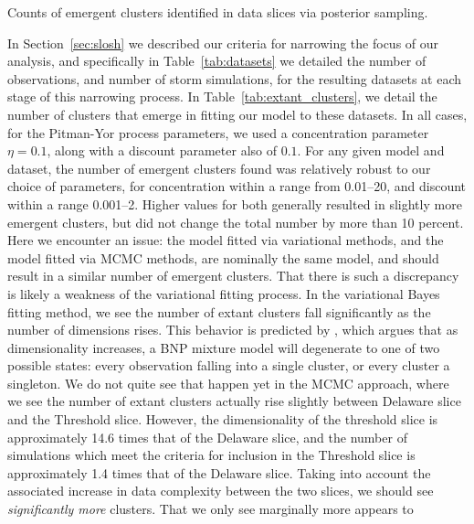 \begin{table}[tb]
    \centering 
    
    \caption{Counts of emergent clusters identified in data slices via posterior sampling.
        \label{tab:extant_clusters}}
\end{table}

In Section~\ref{sec:slosh} we described our criteria for narrowing the focus of our analysis,
    and specifically in Table~\ref{tab:datasets} we detailed the number of observations, and
    number of storm simulations, for the resulting datasets at each stage of this narrowing
    process.  In Table~\ref{tab:extant_clusters}, we detail the number of clusters that emerge
    in fitting our model to these datasets.  In all cases, for the Pitman-Yor process parameters,
    we used a concentration parameter $\eta = 0.1$, along with a discount parameter also of $0.1$.
    For any given model and dataset, the number of emergent clusters found was relatively robust 
    to our choice of parameters, for concentration within a range from \num{0.01}--\num{20}, and
    discount within a range \num{0.001}--\num{2}.  Higher values for both generally resulted in
    slightly more emergent clusters, but did not change the total number by more than \num{10} percent.
    Here we encounter an issue:  the model fitted via variational methods, and the model fitted 
    via MCMC methods, are nominally the same model, and should result in a similar number of 
    emergent clusters. That there is such a discrepancy is likely a weakness of the variational
    fitting process.  In the variational Bayes fitting method, we see the number of extant
    clusters fall significantly as the number of dimensions rises.  This behavior is predicted 
    by \cite{chandra2023}, which argues that as dimensionality increases, a BNP mixture model 
    will degenerate to one of two possible states: every observation falling into a single 
    cluster, or every cluster a singleton. We do not quite see that happen yet in the MCMC approach,
    where we see the number of extant clusters actually rise slightly between Delaware slice 
    and the Threshold slice.  However, the dimensionality of the threshold slice is approximately
    14.6 times that of the Delaware slice, and the number of simulations which meet the criteria
    for inclusion in the Threshold slice is approximately 1.4 times that of the Delaware slice.
    Taking into account the associated increase in data complexity between the two slices, we
    should see \emph{significantly more} clusters.  That we only see marginally more appears to
